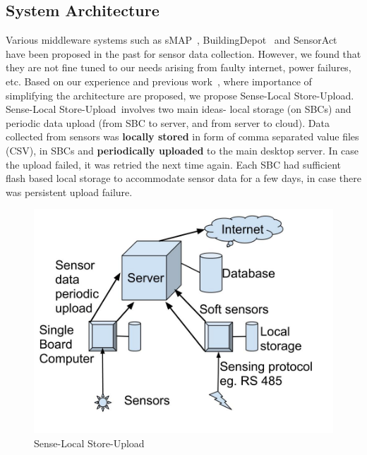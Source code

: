 \documentclass[10pt]{sensys-proc}
\newcommand{\paradigm}{Sense-Local Store-Upload}
\newcommand{\paradigms}{Sense-Local Store-Upload~}
\begin{document}
\subsection{System Architecture}	
\label{sec:architecture}
Various middleware systems such as sMAP~\cite{smap}, BuildingDepot~\cite{buildingdepot} and SensorAct~\cite{Arjunan12} have been proposed in the past for sensor data collection. However, we found that they are not fine tuned to our needs arising from faulty internet, power failures, etc. Based on our experience and previous work~\cite{hitchhiker_residential}, where importance of simplifying the architecture are proposed, we propose \paradigm. \paradigms involves two main ideas- local storage (on SBCs) and periodic data upload (from SBC to server, and from server to cloud). Data collected from sensors was \textbf{locally stored} in form of comma separated value files (CSV), in SBCs and \textbf{periodically uploaded} to the main desktop server. In case the upload failed, it was retried the next time again. Each SBC had sufficient flash based local storage to accommodate sensor data for a few days, in case there was persistent upload failure.

\begin{figure}     
    \centering \includegraphics[scale=0.12]{./figures/architecture.jpg}  
    \vspace{-3mm}  
    \caption{\paradigm}   
    \label{fig:architecture}   
\end{figure}
\end{document}
